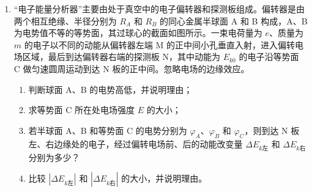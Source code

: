 \documentclass[\gkver]{gaokaozhenti}
\begin{document}
\begin{enumerate}
{$F_{T}-(M+m)g=(M+m)\frac{v_{c}^{2}}{L}$⑥，

由几何关系

$(L-h_{2})^{2}+x_{2}^{2}=L^{2}$⑦，

得：$L=10\Um$⑧。

综合⑤、⑥、⑧式并代入数据解得：

$F_{T}=(M+m)g+(M+m)\frac{v_{c}^{2}}{L}=216\UN$。
}

\item
“电子能量分析器”主要由处于真空中的电子偏转器和探测板组成。偏转器是由两个相互绝缘、半径分别为 $R_{A}$ 和 $R_{B}$ 的同心金属半球面 A 和 B 构成，A、B 为电势值不等的等势面，其过球心的截面如图所示。一束电荷量为 $e$、质量为 $m$ 的电子以不同的动能从偏转器左端 M 的正中间小孔垂直入射，进入偏转电场区域，最后到达偏转器右端的探测板 N，其中动能为 $E_{k0}$ 的电子沿等势面 C 做匀速圆周运动到达 N 板的正中间。忽略电场的边缘效应。
\begin{enumerate}
	\item
	判断球面 A、B 的电势高低，并说明理由；
	\item
	求等势面 C 所在处电场强度 $E$ 的大小；
	\item
	若半球面 A、B 和等势面 C 的电势分别为 $\varphi_{A}$、$\varphi_{B}$ 和 $\varphi_{C}$，则到达 N 板左、右边缘处的电子，经过偏转电场前、后的动能改变量 $\Delta E_{k\text{左}}$ 和 $\Delta E_{k\text{右}}$ 分别为多少？
	\item
	比较 $|\Delta E_{k\text{左}}|$ 和 $|\Delta E_{k\text{右}}|$ 的大小，并说明理由。
\end{enumerate}


\end{enumerate}
\end{document}
